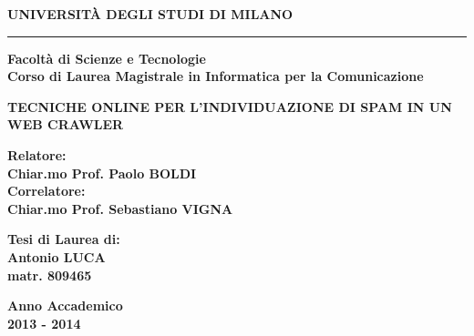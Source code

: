 \begin{titlepage}
\begin{center}

{{\Large{{\bf UNIVERSIT\`A DEGLI STUDI DI MILANO}}}}
\rule[0.1cm]{13cm}{0.6mm}
{\bf Facoltà di Scienze e Tecnologie\\
Corso di Laurea Magistrale in Informatica per la Comunicazione}
\end{center}
\vspace{15mm}
\begin{center}
\vspace{3mm}
{\LARGE{\bf TECNICHE ONLINE PER L'INDIVIDUAZIONE DI SPAM IN UN WEB CRAWLER}}\\
\vspace{3mm}
\end{center}

\vspace{40mm}
\par
\noindent
\begin{minipage}[t]{0.60\textwidth}
{\large{\bf Relatore:\\
Chiar.mo Prof. Paolo BOLDI}}\\
{\large{\bf Correlatore:\\
Chiar.mo Prof. Sebastiano VIGNA}}
\end{minipage}
\hfill
\begin{minipage}[t]{0.47\textwidth}\raggedleft
{\large{\bf Tesi di Laurea di:\\
Antonio LUCA\\
matr. 809465}}
\end{minipage}
\vspace{50mm}
\begin{center}
{\large{\bf %
Anno Accademico\\ 2013 - 2014 }}%
\end{center}
\end{titlepage}